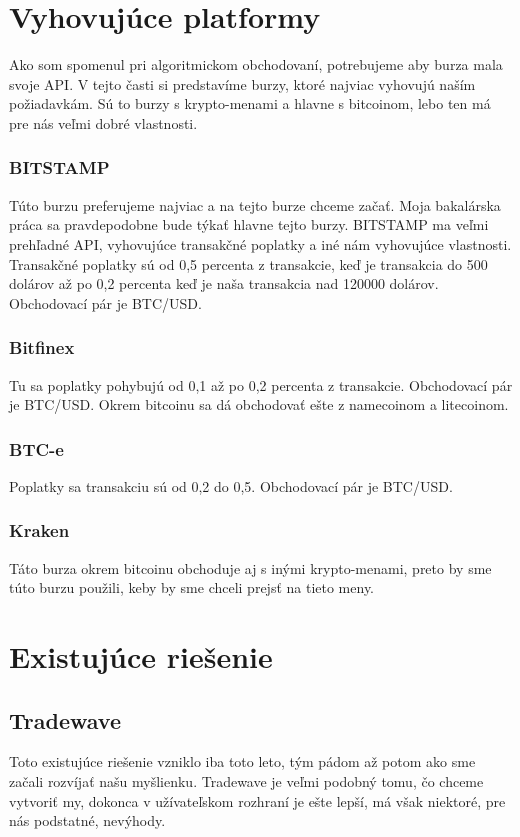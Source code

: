 \section{Vyhovujúce platformy} 
Ako som spomenul pri algoritmickom obchodovaní, potrebujeme aby burza mala svoje API. V tejto časti si predstavíme burzy, ktoré najviac vyhovujú naším požiadavkám. Sú to burzy s krypto-menami a hlavne s bitcoinom, lebo ten má pre nás veľmi dobré vlastnosti. 
\subsubsection{BITSTAMP} 
Túto burzu preferujeme najviac a na tejto burze chceme začať. Moja bakalárska práca sa pravdepodobne bude týkať hlavne tejto burzy. BITSTAMP ma veľmi prehľadné API, vyhovujúce transakčné poplatky a iné nám vyhovujúce vlastnosti. Transakčné poplatky sú od 0,5 percenta z transakcie, keď je transakcia do 500 dolárov až po 0,2 percenta keď je naša transakcia nad 120000 dolárov. Obchodovací pár je BTC/USD. \cite{Bit} 
\subsubsection{Bitfinex} 
Tu sa poplatky pohybujú od 0,1 až po 0,2 percenta z transakcie. Obchodovací pár je BTC/USD. Okrem bitcoinu sa dá obchodovať ešte z namecoinom a litecoinom. \cite{Bitf} 
\subsubsection{BTC-e} 
Poplatky sa transakciu sú od 0,2 do 0,5. Obchodovací pár je BTC/USD. \cite{BTC} 
\subsubsection{Kraken} 
Táto burza okrem bitcoinu obchoduje aj s inými krypto-menami, preto by sme túto burzu použili, keby by sme chceli prejsť na tieto meny. \cite{Kre} 
\section{Existujúce riešenie} 
\subsection{Tradewave} 
Toto existujúce riešenie vzniklo iba toto leto, tým pádom až potom ako sme začali rozvíjať našu myšlienku. Tradewave je veľmi podobný tomu, čo chceme vytvoriť my, dokonca v užívateľskom rozhraní je ešte lepší, má však niektoré, pre nás podstatné, nevýhody.  
